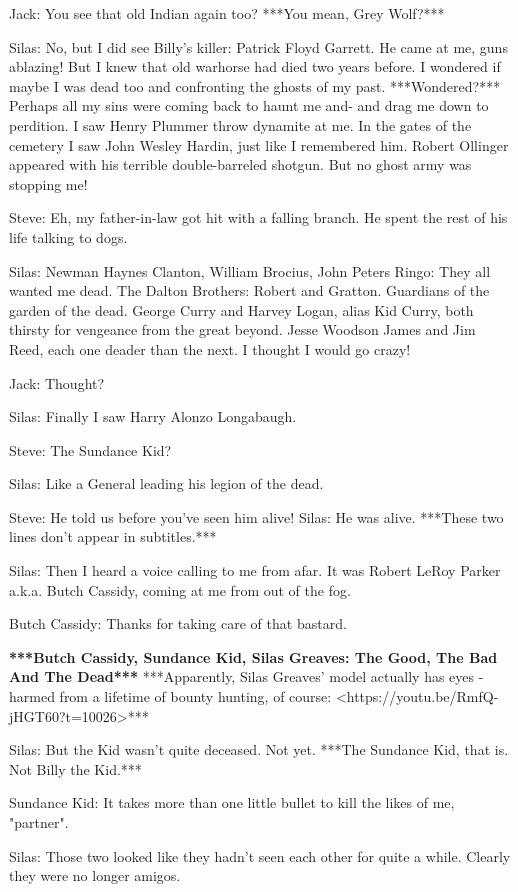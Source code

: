 \documentclass{article}
\begin{document}
Jack: You see that old Indian again too? ***You mean, Grey Wolf?***

Silas: No, but I did see Billy's killer: Patrick Floyd Garrett. He came at me, guns ablazing! But I knew that old warhorse had died two years before. I wondered if maybe I was dead too and confronting the ghosts of my past. ***Wondered?*** Perhaps all my sins were coming back to haunt me and- and drag me down to perdition. I saw Henry Plummer throw dynamite at me. In the gates of the cemetery I saw John Wesley Hardin, just like I remembered him. Robert Ollinger appeared with his terrible double-barreled shotgun. But no ghost army was stopping me!

Steve: Eh, my father-in-law got hit with a falling branch. He spent the rest of his life talking to dogs.

Silas: Newman Haynes Clanton, William Brocius, John Peters Ringo: They all wanted me dead. The Dalton Brothers: Robert and Gratton. Guardians of the garden of the dead. George Curry and Harvey Logan, alias Kid Curry, both thirsty for vengeance from the great beyond. Jesse Woodson James and Jim Reed, each one deader than the next. I thought I would go crazy!

Jack: Thought?

Silas: Finally I saw Harry Alonzo Longabaugh.

Steve: The Sundance Kid?

Silas: Like a General leading his legion of the dead. 

Steve: He told us before you've seen him alive! Silas: He was alive. ***These two lines don't appear in subtitles.***

Silas: Then I heard a voice calling to me from afar. It was Robert LeRoy Parker a.k.a. Butch Cassidy, coming at me from out of the fog.

Butch Cassidy: Thanks for taking care of that bastard.

\textbf{***Butch Cassidy, Sundance Kid, Silas Greaves: The Good, The Bad And The Dead***} ***Apparently, Silas Greaves' model actually has eyes -harmed from a lifetime of bounty hunting, of course: <https://youtu.be/RmfQ-jHGT60?t=10026>***

Silas: But the Kid wasn't quite deceased. Not yet. ***The Sundance Kid, that is. Not Billy the Kid.***

Sundance Kid: It takes more than one little bullet to kill the likes of me, "partner".

Silas: Those two looked like they hadn't seen each other for quite a while. Clearly they were no longer amigos.
\end{document}
